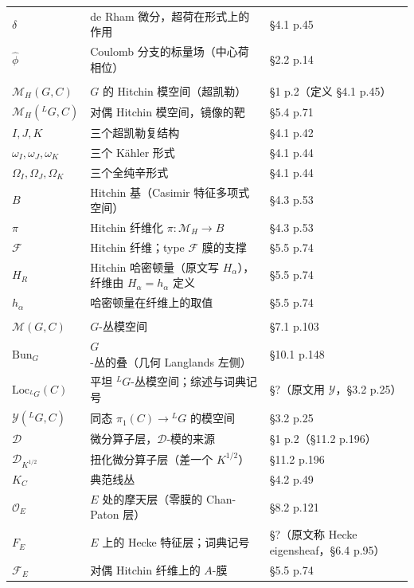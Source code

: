 \begin{longtable}{@{}p{3.4cm}p{7.4cm}p{4.3cm}@{}}
$\delta$ & de Rham 微分，超荷在形式上的作用 & \S4.1 p.45 \\
$\hat\phi$ & Coulomb 分支的标量场（中心荷相位） & \S2.2 p.14 \\
\addlinespace[4pt]
\multicolumn{3}{@{}l}{\bfseries 三、Hitchin 模空间与可积系统}\\
\addlinespace[2pt]
$\mathcal M_H(G,C)$ & $G$ 的 Hitchin 模空间（超凯勒） & \S1 p.2（定义 \S4.1 p.45） \\
$\mathcal M_H({}^LG,C)$ & 对偶 Hitchin 模空间，镜像的靶 & \S5.4 p.71 \\
$I,J,K$ & 三个超凯勒复结构 & \S4.1 p.42 \\
$\omega_I,\omega_J,\omega_K$ & 三个 Kähler 形式 & \S4.1 p.44 \\
$\Omega_I,\Omega_J,\Omega_K$ & 三个全纯辛形式 & \S4.1 p.44 \\
$B$ & Hitchin 基（Casimir 特征多项式空间） & \S4.3 p.53 \\
$\pi$ & Hitchin 纤维化 $\pi:\mathcal M_H\to B$ & \S4.3 p.53 \\
$\mathcal F$ & Hitchin 纤维；type $\mathcal F$ 膜的支撑 & \S5.5 p.74 \\
$H_R$ & Hitchin 哈密顿量（原文写 $H_\alpha$），纤维由 $H_\alpha=h_\alpha$ 定义 & \S5.5 p.74 \\
$h_\alpha$ & 哈密顿量在纤维上的取值 & \S5.5 p.74 \\
\addlinespace[4pt]
\multicolumn{3}{@{}l}{\bfseries 四、模空间、层与翻译}\\
\addlinespace[2pt]
$\mathcal M(G,C)$ & $G$-丛模空间 & \S7.1 p.103 \\
$\mathrm{Bun}_G$ & $G$-丛的叠（几何 Langlands 左侧） & \S10.1 p.148 \\
$\mathrm{Loc}_{{}^LG}(C)$ & 平坦 ${}^LG$-丛模空间；综述与词典记号 & \S?（原文用 $\mathcal Y$，\S3.2 p.25） \\
$\mathcal Y({}^LG,C)$ & 同态 $\pi_1(C)\to{}^LG$ 的模空间 & \S3.2 p.25 \\
$\mathcal D$ & 微分算子层，$\mathcal D$-模的来源 & \S1 p.2（\S11.2 p.196） \\
$\mathcal D_{K^{1/2}}$ & 扭化微分算子层（差一个 $K^{1/2}$） & \S11.2 p.196 \\
$K_C$ & 典范线丛 & \S4.2 p.49 \\
$\mathcal O_E$ & $E$ 处的摩天层（零膜的 Chan-Paton 层） & \S8.2 p.121 \\
$F_E$ & $E$ 上的 Hecke 特征层；词典记号 & \S?（原文称 Hecke eigensheaf，\S6.4 p.95） \\
$\mathcal F_E$ & 对偶 Hitchin 纤维上的 $A$-膜 & \S5.5 p.74 \\

\end{longtable}
